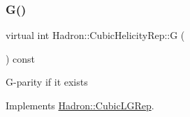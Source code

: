 \subsubsection{\texorpdfstring{G()}{G()}\hspace{0.1cm}{\footnotesize\ttfamily [3/3]}}
{\footnotesize\ttfamily virtual int Hadron\+::\+Cubic\+Helicity\+Rep\+::G (\begin{DoxyParamCaption}{ }\end{DoxyParamCaption}) const\hspace{0.3cm}{\ttfamily [pure virtual]}}

G-\/parity if it exists 

Implements \mbox{\hyperlink{structHadron_1_1CubicLGRep_ace26f7b2d55e3a668a14cb9026da5231}{Hadron\+::\+Cubic\+L\+G\+Rep}}.



